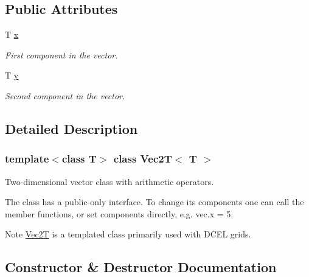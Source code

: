 \subsection*{Public Attributes}
\begin{DoxyCompactItemize}
\item 
\mbox{\label{classVec2T_a66ea295b52114b22de1f76cce1aa7f51}} 
T \hyperlink{classVec2T_a66ea295b52114b22de1f76cce1aa7f51}{x}
\begin{DoxyCompactList}\small\item\em First component in the vector. \end{DoxyCompactList}\item 
\mbox{\label{classVec2T_a71ce5251d618a6dbd4e0e7a0f867b6cf}} 
T \hyperlink{classVec2T_a71ce5251d618a6dbd4e0e7a0f867b6cf}{y}
\begin{DoxyCompactList}\small\item\em Second component in the vector. \end{DoxyCompactList}\end{DoxyCompactItemize}


\subsection{Detailed Description}
\subsubsection*{template$<$class T$>$\newline
class Vec2\+T$<$ T $>$}

Two-\/dimensional vector class with arithmetic operators. 

The class has a public-\/only interface. To change it\textquotesingle{}s components one can call the member functions, or set components directly, e.\+g. vec.\+x = 5. \begin{DoxyNote}{Note}
\hyperlink{classVec2T}{Vec2T} is a templated class primarily used with D\+C\+EL grids. 
\end{DoxyNote}


\subsection{Constructor \& Destructor Documentation}
\mbox{\label{classVec2T_a15e8a7710ad0a1de03a34660ae54e96e}} 
